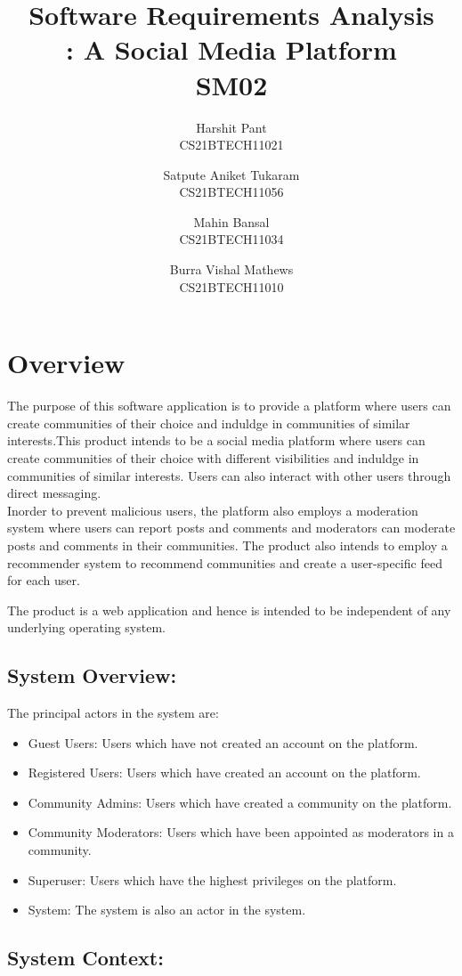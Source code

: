 \documentclass[11pt]{article}
\title{Software Requirements Analysis\\\Name : A Social Media Platform\\ SM02}
\author{Harshit Pant \\ CS21BTECH11021 \and Satpute Aniket Tukaram \\ CS21BTECH11056 \and Mahin Bansal \\ CS21BTECH11034 \and Burra Vishal Mathews \\ CS21BTECH11010}
\date{}
\begin{document}
\maketitle
\section{Overview}
The purpose of this software application is to provide a platform where users can create communities of their choice and induldge in communities of similar interests.This product intends to be a social media platform where users can create communities of their choice with different visibilities and induldge in communities of similar interests. Users can also interact with other users through direct messaging.\\
Inorder to prevent malicious users, the platform also employs a moderation system where users can report posts and comments and moderators can moderate posts and comments in their communities.
The product also intends to employ a recommender system to recommend communities and create a user-specific feed for each user.

The product is a web application and hence is intended to be independent of any underlying operating system.
    
\subsection{System Overview:}
 The principal actors in the system are:
\begin{itemize}
    \item Guest Users: Users which have not created an account on the platform.
    \item Registered Users: Users which have created an account on the platform.
    \item Community Admins: Users which have created a community on the platform.
    \item Community Moderators: Users which have been appointed as moderators in a community.
    \item Superuser: Users which have the highest privileges on the platform.
    \item System: The system is also an actor in the system.
\end{itemize}
\subsection{System Context:}
\end{document}
